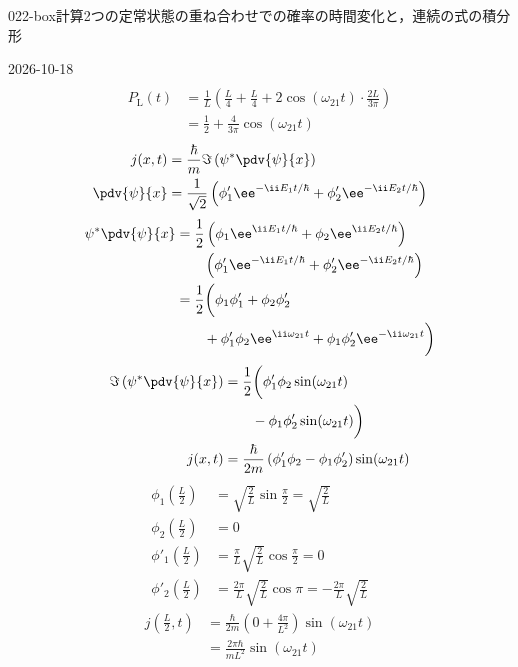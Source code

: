 \documentclass[uplatex,dvipdfmx,a4paper,11pt]{jsarticle}
\begin{document}
\begin{mondai}{022-box}{計算}{2つの定常状態の重ね合わせでの確率の時間変化と，連続の式の積分形}
\begin{kotaeutsushi}{2026-10-18}
\begin{align*}
\end{align*}
\begin{align*}
P_{\mathrm{L}}(t)&=\frac{1}{L}\left(\frac{L}{4}+\frac{L}{4}+2\cos(\omega_{21}t)\cdot\frac{2L}{3\pi}\right)\\
&=\frac{1}{2}+\frac{4}{3\pi}\cos(\omega_{21}t)
\end{align*}
\begin{align*}
j(x,t)&=\frac{\hbar}{m}\Im\left(\psi^{*}\pdv{\psi}{x}\right)\\
\pdv{\psi}{x}&=\frac{1}{\sqrt{2}}\left(\phi'_{1}\ee^{-\ii E_{1}t/\hbar}+\phi'_{2}\ee^{-\ii E_{2}t/\hbar}\right)
\end{align*}
\begin{align*}
\psi^{*}\pdv{\psi}{x}&=\frac{1}{2}\left(\phi_{1}\ee^{\ii E_{1}t/\hbar}+\phi_{2}\ee^{\ii E_{2}t/\hbar}\right)\\
&\qquad\left(\phi'_{1}\ee^{-\ii E_{1}t/\hbar}+\phi'_{2}\ee^{-\ii E_{2}t/\hbar}\right)\\
&=\frac{1}{2}\biggl(\phi_{1}\phi'_{1}+\phi_{2}\phi'_{2}\\
&\qquad+\phi'_{1}\phi_{2}\ee^{\ii\omega_{21}t}+\phi_{1}\phi'_{2}\ee^{-\ii\omega_{21}t}\biggr)
\end{align*}
\begin{align*}
\Im\left(\psi^{*}\pdv{\psi}{x}\right)&=\frac{1}{2}\biggl(\phi'_{1}\phi_{2}\sin(\omega_{21}t)\\
&\qquad-\phi_{1}\phi'_{2}\sin(\omega_{21}t)\biggr)\\
j(x,t)&=\frac{\hbar}{2m}\left(\phi'_{1}\phi_{2}-\phi_{1}\phi'_{2}\right)\sin(\omega_{21}t)
\end{align*}
\begin{align*}
\phi_{1}\left(\frac{L}{2}\right)&=\sqrt{\frac{2}{L}}\sin\frac{\pi}{2}=\sqrt{\frac{2}{L}}\\
\phi_{2}\left(\frac{L}{2}\right)&=0\\
\phi'_{1}\left(\frac{L}{2}\right)&=\frac{\pi}{L}\sqrt{\frac{2}{L}}\cos\frac{\pi}{2}=0\\
\phi'_{2}\left(\frac{L}{2}\right)&=\frac{2\pi}{L}\sqrt{\frac{2}{L}}\cos\pi=-\frac{2\pi}{L}\sqrt{\frac{2}{L}}
\end{align*}
\begin{align*}
j\left(\frac{L}{2},t\right)&=\frac{\hbar}{2m}\left(0+\frac{4\pi}{L^{2}}\right)\sin(\omega_{21}t)\\
&=\frac{2\pi\hbar}{mL^{2}}\sin(\omega_{21}t)
\end{align*}
\begin{align*}

\end{align*}
\end{kotaeutsushi}
\end{mondai}
\end{document}

